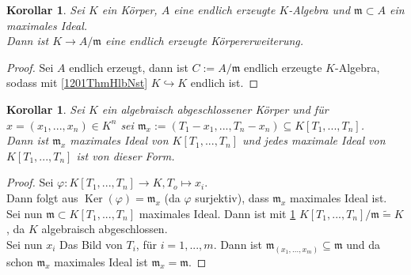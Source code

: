 \documentclass[10pt,a4paper]{article}
\newcommand{\isomorph}{\ensuremath{\tilde{=}}}
\newcommand{\Ker}{\ensuremath{\operatorname{Ker}}}
\newcounter{thm}[section]
\theoremstyle{definition}
\theoremstyle{plain}
\newtheorem{kor}[thm]{Korollar}
\theoremstyle{remark}
\begin{document}
\begin{kor}\label{1202kor}
	Sei $K$ ein Körper, $A$ eine endlich erzeugte $K$-Algebra und $\mathfrak m\subset A$ ein maximales Ideal.\\
	Dann ist $K\to A/\mathfrak m$ eine endlich erzeugte Körpererweiterung.
\end{kor}
\begin{proof}
	Sei $A$ endlich erzeugt, dann ist $C:=A/\mathfrak  m$ endlich erzeugte $K$-Algebra, sodass mit \ref{1201ThmHlbNst} $K\hookrightarrow K$ endlich ist.
\end{proof}

\begin{kor}\label{1203kor}
	Sei $K$ ein algebraisch abgeschlossener Körper und für $x=(x_1,...,x_n)\in K^n$ sei $\mathfrak m_x:=(T_1-x_1,...,T_n-x_n)\subseteq K[T_1,...,T_n]$.\\
	Dann ist $\mathfrak m_x$ maximales Ideal von $K[T_1,...,T_n]$ und jedes maximale Ideal von $K[T_1,...,T_n]$ ist von dieser Form.
\end{kor}
\begin{proof}
	Sei $\varphi:K[T_1,...,T_n]\to K, T_o\mapsto x_i$.\\
	Dann folgt aus $\Ker(\varphi)=\mathfrak m_x$ (da $\varphi$ surjektiv), dass $\mathfrak m_x$ maximales Ideal ist.\\
	Sei nun $\mathfrak m\subset K[T_1,...,T_n]$ maximales Ideal. Dann ist mit \ref{1202kor} $K[T_1,...,T_n]/\mathfrak m\isomorph K$, da $K$ algebraisch abgeschlossen.\\
	Sei nun $x_i$ Das Bild von $T_i$, für $i=1,...,m$. Dann ist $\mathfrak m_{(x_1,...,x_m)}\subseteq\mathfrak m$ und da schon $\mathfrak m_x$ maximales Ideal ist $\mathfrak m_x=\mathfrak m$.
\end{proof}
\end{document}

